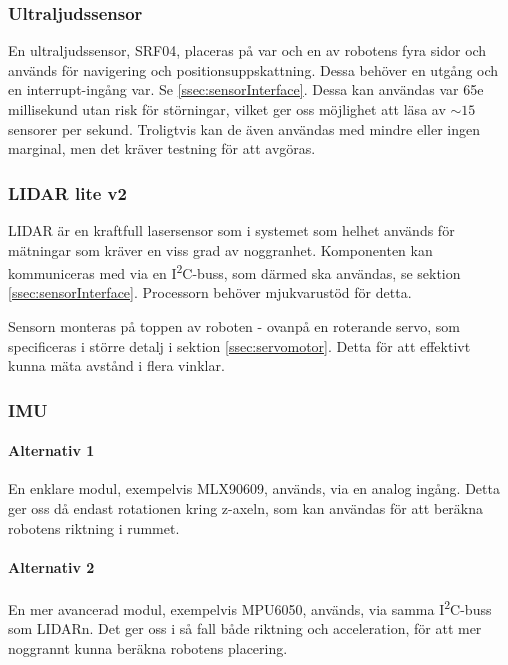 \documentclass[a4paper,11pt]{article}
\begin{document}
\subsubsection{Ultraljudssensor} \label{sssec:sonicsensors}
En ultraljudssensor, SRF04, placeras på var och en av robotens fyra sidor och används för navigering och positionsuppskattning. Dessa behöver en utgång och en interrupt-ingång var. Se \ref{ssec:sensorInterface}. Dessa kan användas var 65e millisekund utan risk för störningar, vilket ger oss möjlighet att läsa av $\sim15$ sensorer per sekund. Troligtvis kan de även användas med mindre eller ingen marginal, men det kräver testning för att avgöras. %

\subsubsection{LIDAR lite v2} \label{sssec:lidar}
LIDAR är en kraftfull lasersensor som i systemet som helhet används för mätningar som kräver en viss grad av noggranhet. Komponenten kan kommuniceras med via en I\textsuperscript{2}C-buss, som därmed ska användas, se sektion \ref{ssec:sensorInterface}. Processorn behöver mjukvarustöd för detta.

Sensorn monteras på toppen av roboten - ovanpå en roterande servo, som specificeras i större detalj i sektion \ref{ssec:servomotor}. Detta för att effektivt kunna mäta avstånd i flera vinklar.

\subsubsection{IMU} \label{sssec:imu}

\paragraph{Alternativ 1}
En enklare modul, exempelvis MLX90609, används, via en analog ingång. Detta ger oss då endast rotationen kring z-axeln, som kan användas för att beräkna robotens riktning i rummet.

\paragraph{Alternativ 2}
En mer avancerad modul, exempelvis MPU6050, används, via samma I\textsuperscript{2}C-buss som LIDARn. Det ger oss i så fall både riktning och acceleration, för att mer noggrannt kunna beräkna robotens placering. %
\end{document}
